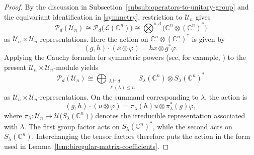 \documentclass[11pt,showkeys]{amsart}
\begin{document}
\begin{proof}
By the discussion in
Subsection~\ref{subsub:operators-to-unitary-group} and the equivariant
identification in \eqref{symmetry}, restriction to \(\mathcal U_n\)
gives
\[
    \mathcal P_d(\mathcal U_n)
    \cong
    \mathcal P_d\bigl(\mathcal L(\mathbb C^n)\bigr)
    \cong
    \bigotimes\nolimits^{s,d}
    \bigl(\mathbb C^n\otimes(\mathbb C^n)^*\bigr)
\]
as \(\mathcal U_n\times\mathcal U_n\)-representations. Here the
action on \(\mathbb C^n\otimes(\mathbb C^n)^*\) is given by
\[
    (g,h)\cdot(x\otimes\varphi)
    =
    hx\otimes g^*\varphi.
\]
Applying the Cauchy formula for symmetric powers (see, for example,
\cite[Exercise~6.11]{fulton2013representation}) to the present
\(\mathcal U_n\times\mathcal U_n\)-module yields
\[
    \mathcal P_d(\mathcal U_n)
    \cong
    \bigoplus_{\substack{\lambda\vdash d\\ \ell(\lambda)\le n}}
    S_\lambda(\mathbb C^n)
    \otimes
    S_\lambda(\mathbb C^n)^*
\]
as \(\mathcal U_n\times\mathcal U_n\)-representations.
On the
summand corresponding to \(\lambda\), the action is
\[
    (g,h)\cdot(u\otimes\varphi)
    =
    \pi_\lambda(h)u
    \otimes
    \pi_\lambda^*(g)\varphi,
\]
where
\(
    \pi_\lambda:
    \mathcal U_n
    \longrightarrow
    \mathcal U\bigl(S_\lambda(\mathbb C^n)\bigr)
\)
denotes the irreducible representation associated with \(\lambda\).
The first group factor acts on \(S_\lambda(\mathbb C^n)^*\), while
the second acts on \(S_\lambda(\mathbb C^n)\). Interchanging the tensor
factors therefore puts the action in the form used in
Lemma~\ref{lem:biregular-matrix-coefficients}.


\end{proof}
\end{document}

